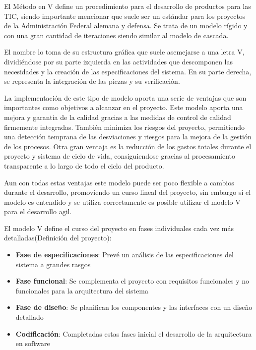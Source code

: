 \hfill \break
\justifying
El Método en V define un procedimiento para el desarrollo de productos para las TIC, siendo importante mencionar que suele ser un estándar para los proyectos de la Administración Federal alemana y defensa.
Se trata de un modelo rígido y con una gran cantidad de iteraciones siendo similar al modelo de cascada.

\hfill \break
\justifying
El nombre lo toma de su estructura gráfica que suele asemejarse a una letra V, dividiéndose por su parte izquierda en las actividades que descomponen las necesidades y la creación de las especificaciones del sistema. En su parte derecha, se representa la integración de las piezas y su verificación.

\hfill \break
\justifying
La implementación de este tipo de modelo aporta una serie de ventajas que son importantes como objetivos a alcanzar en el proyecto. Este modelo aporta una mejora y garantia de la calidad gracias a las medidas de control de calidad firmemente integradas.
También minimiza los riesgos del proyecto, permitiendo una detección temprana de las desviaciones y riesgos para la mejora de la gestión de los procesos. Otra gran ventaja es la reducción de los gastos totales durante el proyecto y sistema de ciclo de vida, consiguiendose gracias al procesamiento transparente a lo largo de todo el ciclo del producto.

\hfill \break
\justifying
Aun con todas estas ventajas este modelo puede ser poco flexible a cambios durante el desarrollo, promoviendo un curso lineal del proyecto, sin embargo si el modelo es entendido y se utiliza correctamente es posible utilizar el modelo V para el desarrollo agil.

\hfill \break
\justifying
El modelo V define el curso del proyecto en fases individuales cada vez más detalladas(Definición del proyecto):
\begin{itemize}
	\item \textbf{Fase de especificaciones}: Prevé un análisis de las especificaciones del sistema a grandes rasgos
	\item \textbf{Fase funcional}: Se complementa el proyecto con requisitos funcionales y no funcionales para la arquitectura del sistema
	\item \textbf{Fase de diseño}: Se planifican los componentes y las interfaces con un diseño detallado
	\item \textbf{Codificación}: Completadas estas fases inicial el desarrollo de la arquitectura en software
\end{itemize}

